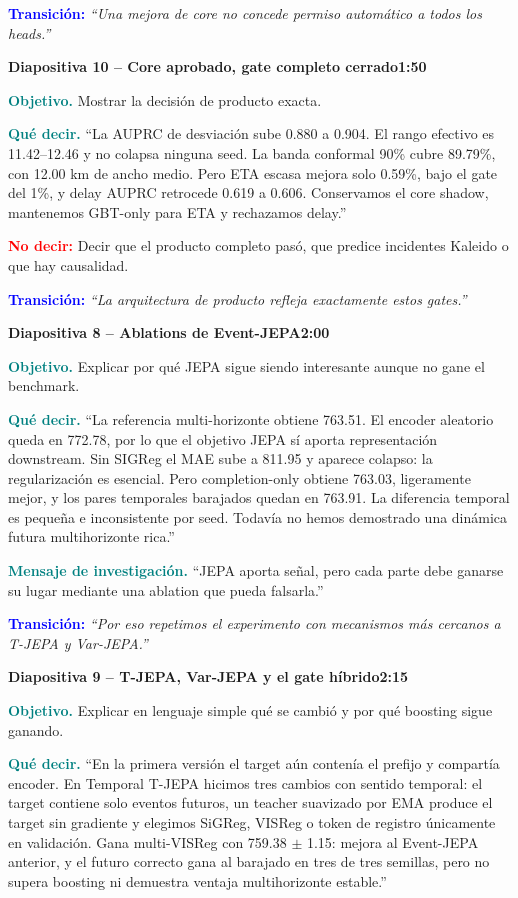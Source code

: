 \documentclass[11pt,a4paper]{article}
\newcommand{\slidehead}[3]{%
  \par\vspace{7pt}\noindent
  \colorbox{Ink}{\parbox{\dimexpr\linewidth-2\fboxsep\relax}{%
    \color{white}\textbf{Diapositiva #1 -- #2}\hfill\color{Teal!45}\textbf{#3}}}%
  \par\vspace{5pt}}
\newcommand{\cue}[1]{\textcolor{Teal}{\textbf{#1}}}
\newcommand{\avoid}[1]{\textcolor{Red}{\textbf{No decir:}} #1}
\newcommand{\transition}[1]{\textcolor{Blue}{\textbf{Transición:}} \emph{``#1''}}
\begin{document}
\transition{Una mejora de core no concede permiso automático a todos los heads.}

\slidehead{10}{Core aprobado, gate completo cerrado}{1:50}
\cue{Objetivo.} Mostrar la decisión de producto exacta.

\cue{Qué decir.} ``La AUPRC de desviación sube 0.880 a 0.904.
El rango efectivo es 11.42--12.46 y no colapsa ninguna seed. La banda
conformal 90\% cubre 89.79\%, con 12.00 km de ancho medio. Pero ETA escasa
mejora solo 0.59\%, bajo el gate del 1\%, y delay AUPRC retrocede
0.619 a 0.606. Conservamos el core shadow, mantenemos GBT-only
para ETA y rechazamos delay.''

\avoid{Decir que el producto completo pasó, que predice incidentes Kaleido o que hay causalidad.}

\transition{La arquitectura de producto refleja exactamente estos gates.}

\iffalse
\slidehead{8}{Ablations de Event-JEPA}{2:00}
\cue{Objetivo.} Explicar por qué JEPA sigue siendo interesante aunque no gane el benchmark.

\cue{Qué decir.} ``La referencia multi-horizonte obtiene 763.51. El encoder aleatorio
queda en 772.78, por lo que el objetivo JEPA sí aporta representación downstream.
Sin SIGReg el MAE sube a 811.95 y aparece colapso: la regularización es esencial.
Pero completion-only obtiene 763.03, ligeramente mejor, y los pares temporales
barajados quedan en 763.91. La diferencia temporal es pequeña e inconsistente
por seed. Todavía no hemos demostrado una dinámica futura multihorizonte rica.''

\cue{Mensaje de investigación.} ``JEPA aporta señal, pero cada parte debe ganarse su lugar
mediante una ablation que pueda falsarla.''

\transition{Por eso repetimos el experimento con mecanismos más cercanos a T-JEPA y Var-JEPA.}

\clearpage
\slidehead{9}{T-JEPA, Var-JEPA y el gate híbrido}{2:15}
\cue{Objetivo.} Explicar en lenguaje simple qué se cambió y por qué boosting sigue ganando.

\cue{Qué decir.} ``En la primera versión el target aún contenía el prefijo y compartía
encoder. En Temporal T-JEPA hicimos tres cambios con sentido temporal: el target contiene
solo eventos futuros, un teacher suavizado por EMA produce el target sin gradiente y elegimos
SiGReg, VISReg o token de registro únicamente en validación. Gana multi-VISReg con
759.38 $\pm$ 1.15: mejora al Event-JEPA anterior, y el futuro correcto gana
al barajado en tres de tres semillas, pero no supera boosting ni demuestra ventaja
multihorizonte estable.''
\end{document}
